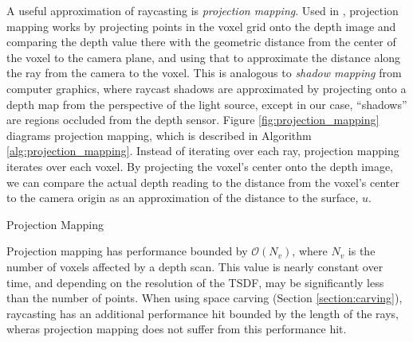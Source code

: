\documentclass[10pt,twocolumn,letterpaper]{article}
\begin{document}
A useful approximation of raycasting is \textit{projection mapping}. Used in
\cite{Nguyen2012, Bylow2013, Klingensmith2014}, projection mapping works by
projecting points in the voxel grid onto the depth image and comparing the depth value
there with the geometric distance from the center of the voxel to the camera
plane, and using that to approximate the distance along the ray from the camera
to the voxel. This is analogous to \textit{shadow mapping} \cite{Shadowmapping}
from computer graphics, where raycast shadows are approximated by projecting
onto a depth map from the perspective of the light source, except in our case, 
``shadows'' are regions occluded from the depth sensor.  Figure 
\ref{fig:projection_mapping} diagrams projection mapping, which is described in
Algorithm \ref{alg:projection_mapping}. Instead of iterating over each ray,
projection mapping iterates over each voxel. By projecting the voxel's center
onto the depth image, we can compare the actual depth reading to the distance
from the voxel's center to the camera origin as an approximation of the
distance to the surface, $u$. 

\begin{algorithm} 
	\caption{Projection Mapping}
	\label{alg:projection_mapping}
	\begin{algorithmic}[1]
		    	\label{alg:line:voxel_carve}
			\EndIf
	    \EndIf
			\label{alg:line:tsdf_update}
		\EndIf
	\EndFor
	\end{algorithmic}
\end{algorithm}

Projection mapping has performance bounded by $\mathcal{O}(N_v)$, where $N_v$ is
the number of voxels affected by a depth scan. This value is nearly constant
over time, and depending on the resolution of the TSDF, may be significantly
less than the number of points. When using space carving (Section
\ref{section:carving}), raycasting has an additional performance hit bounded by
the length of the rays, wheras projection mapping does not suffer from this
performance hit. 
\end{document}
